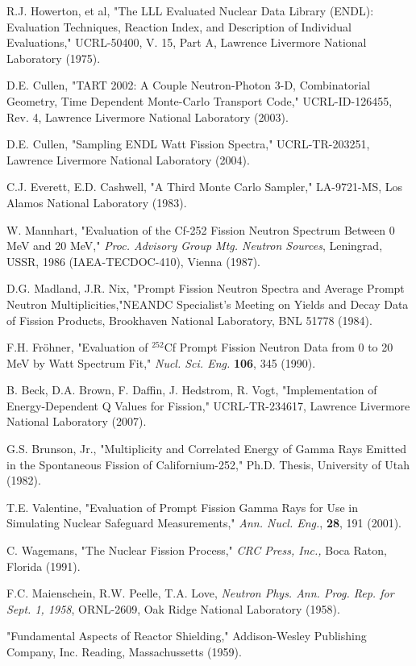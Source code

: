 \documentclass[11pt]{article}
\begin{document}
\begin{thebibliography}{99}
 R.J. Howerton, et al, "The LLL
Evaluated Nuclear Data Library (ENDL): Evaluation Techniques, Reaction
Index, and Description of Individual Evaluations," UCRL-50400, V. 15,
Part A, Lawrence Livermore National Laboratory (1975).

 D.E. Cullen, "TART 2002: A Couple
Neutron-Photon 3-D, Combinatorial Geometry, Time Dependent Monte-Carlo
Transport Code," UCRL-ID-126455, Rev. 4, Lawrence Livermore National
Laboratory (2003).  

 D.E. Cullen, "Sampling ENDL Watt Fission
Spectra," UCRL-TR-203251, Lawrence Livermore National Laboratory
(2004).  

 C.J. Everett, E.D. Cashwell, "A Third
Monte Carlo Sampler," LA-9721-MS, Los Alamos National Laboratory
(1983).  


 W. Mannhart, "Evaluation
of the Cf-252 Fission Neutron Spectrum Between 0 MeV and 20 MeV,"
\textit{Proc. Advisory Group Mtg. Neutron Sources}, Leningrad, USSR,
1986 (IAEA-TECDOC-410), Vienna (1987).  

D.G. Madland, J.R. Nix, "Prompt Fission Neutron Spectra and Average
Prompt Neutron Multiplicities,"NEANDC Specialist's Meeting on Yields
and Decay Data of Fission Products, Brookhaven National Laboratory,
BNL 51778 (1984).  

 F.H. Fr\"{o}hner,
"Evaluation of $^{252}$Cf Prompt Fission Neutron Data from 0 to 20 MeV
by Watt Spectrum Fit," \textit{Nucl. Sci. Eng.} \textbf{106}, 345
(1990).  

 B. Beck, D.A. Brown, F. Daffin, J. Hedstrom,
R. Vogt, "Implementation of Energy-Dependent Q Values for Fission,"
UCRL-TR-234617, Lawrence Livermore National Laboratory (2007).

 G.S. Brunson, Jr., "Multiplicity and
Correlated Energy of Gamma Rays Emitted in the Spontaneous Fission of
Californium-252," Ph.D. Thesis, University of Utah (1982).

 T.E. Valentine, "Evaluation of Prompt Fission
Gamma Rays for Use in Simulating Nuclear Safeguard Measurements,"
\textit{Ann. Nucl. Eng.}, \textbf{28}, 191 (2001).  

 C. Wagemans, "The Nuclear Fission Process," \textit{CRC Press,
Inc.,} Boca Raton, Florida (1991).  

F.C. Maienschein, R.W. Peelle, T.A. Love, \textit{Neutron
Phys. Ann. Prog. Rep. for Sept. 1, 1958}, ORNL-2609, Oak Ridge
National Laboratory (1958).  

 "Fundamental
Aspects of Reactor Shielding," Addison-Wesley Publishing Company,
Inc. Reading, Massachussetts (1959).

\end{thebibliography}
\end{document}
